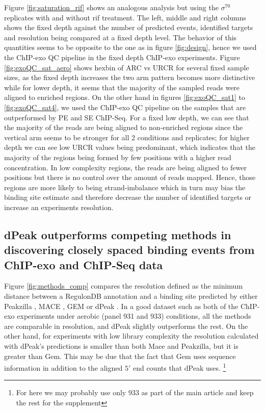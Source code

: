 \documentclass{bmcart}\usepackage[]{graphicx}\usepackage[]{color}
\newcommand{\sig}{\sigma^{70}}
\begin{document}
Figure \ref{fig:saturation_rif} shows an analogous analysis but using
the $\sig$ replicates with and without rif treatment. The left, middle
and right columns shows the fixed depth against the number of
predicted events, identified targets and resolution being compared at
a fixed depth level. The behavior of this quantities seems to be
opposite to the one as in figure \ref{fig:design}, hence we used the
ChIP-exo QC pipeline in the fixed depth ChIP-exo experiments. Figure
\ref{fig:exoQC_sat_aero} shows hexbin of ARC vs URCR for several fixed
sample sizes, as the fixed depth increases the two arm pattern becomes
more distinctive while for lower depth, it seems that the majority of
the sampled reads were aligned to enriched regions. On the other hand
in figures \ref{fig:exoQC_sat1} to \ref{fig:exoQC_sat4}, we used the
ChIP-exo QC pipeline on the samples that are outperformed by PE and SE
ChIP-Seq. For a fixed low depth, we can see that the majority of the
reads are being aligned to non-enriched regions since the vertical arm
seems to be stronger for all 2 conditions and replicates; for higher
depth we can see low URCR values being predominant, which indicates
that the majority of the regions being formed by few positions with a
higher read concentration. In low complexity regions, the reads are
being aligned to fewer positions but there is no control over the
amount of reads mapped. Hence, those regions are more likely to being
strand-imbalance which in turn may bias the binding site estimate and
therefore decrease the number of identified targets or increase an
experiments resolution.


\subsection{dPeak outperforms competing methods in discovering closely
  spaced binding events from ChIP-exo and ChIP-Seq data}

Figure \ref{fig:methods_comp} compares the resolution defined as the
minimum distance between a RegulonDB annotation and a binding site
predicted by either Peakzilla \cite{peakzilla}, MACE \cite{mace}, GEM
\cite{gem} or dPeak \cite{dpeak}. In a good dataset such as both of
the ChIP-exo experiments under aerobic (panel 931 and 933) conditions,
all the methods are comparable in resolution, and dPeak slightly
outperforms the rest. On the other hand, for experiments with low
library complexity the resolution calculated with dPeak's predictions
is smaller than both Mace and Peakzilla, but it is greater than
Gem. This may be due that the fact that Gem uses sequence information
in addition to the aligned $5\prime$ end counts that dPeak
uses. \footnote{For here we may probably use only 933 as part of the
  main article and keep the rest for the supplement}
\end{document}
